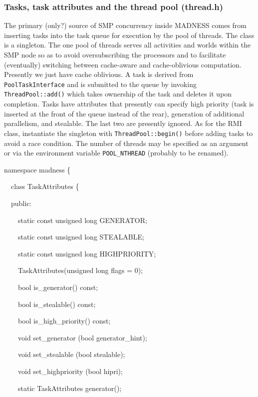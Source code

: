 \documentclass[letterpaper]{article}
\begin{document}
\subsubsection{Tasks, task attributes and the thread pool (thread.h)}
The primary (only?) source of SMP concurrency inside MADNESS comes from inserting tasks into the task queue for
execution by the pool of threads. The class is a singleton. The one pool of threads serves all activities and worlds
within the SMP node so as to avoid oversubscribing the processors and to facilitate (eventually) switching between
cache-aware and cache-oblivious computation. Presently we just have cache oblivious. A task is derived from
\texttt{PoolTaskInterface} and is submitted to the queue by invoking \texttt{ThreadPool::add()} which takes ownership
of the task and deletes it upon completion. Tasks have attributes that presently can specify high priority (task is
inserted at the front of the queue instead of the rear), generation of additional parallelism, and stealable. The last
two are presently ignored. As for the RMI class, instantiate the singleton with \texttt{ThreadPool::begin()} before
adding tasks to avoid a race condition. The number of threads may be specified as an argument or via the environment
variable \texttt{POOL\_NTHREAD} (probably to be renamed).

{\ttfamily
namespace madness \{}

{\ttfamily
\ \ class TaskAttributes \{}

{\ttfamily
\ \ public:}

{\ttfamily
\ \ \ \ static const unsigned long GENERATOR;}

{\ttfamily
\ \ \ \ static const unsigned long STEALABLE;}

{\ttfamily
\ \ \ \ static const unsigned long HIGHPRIORITY;}

{\ttfamily
\ \ \ \ TaskAttributes(unsigned long flags = 0);}

{\ttfamily
\ \ \ \ bool is\_generator() const;}

{\ttfamily
\ \ \ \ bool is\_stealable() const;}

{\ttfamily
\ \ \ \ bool is\_high\_priority() const;}

{\ttfamily
\ \ \ \ void set\_generator (bool generator\_hint);}

{\ttfamily
\ \ \ \ void set\_stealable (bool stealable);}

{\ttfamily
\ \ \ \ void set\_highpriority (bool hipri);}

{\ttfamily
\ \ \ \ static TaskAttributes generator();}
\end{document}
